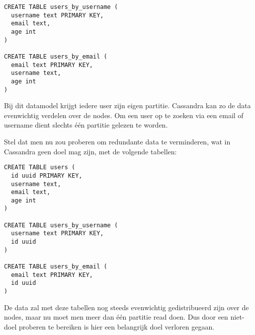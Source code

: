 \begin{lstlisting}
CREATE TABLE users_by_username (
  username text PRIMARY KEY,
  email text,
  age int
)

CREATE TABLE users_by_email (
  email text PRIMARY KEY,
  username text,
  age int
)
\end{lstlisting}

Bij dit datamodel krijgt iedere user zijn eigen partitie.
Cassandra kan zo de data evenwichtig verdelen over de nodes.
Om een user op te zoeken via een email of username dient slechts één partitie gelezen te worden.

Stel dat men nu zou proberen om redundante data te verminderen, wat in Cassandra geen doel mag zijn, met de volgende tabellen:

\begin{lstlisting}
CREATE TABLE users (
  id uuid PRIMARY KEY,
  username text,
  email text,
  age int
)

CREATE TABLE users_by_username (
  username text PRIMARY KEY,
  id uuid
)

CREATE TABLE users_by_email (
  email text PRIMARY KEY,
  id uuid
)
\end{lstlisting}

De data zal met deze tabellen nog steeds evenwichtig gedistribueerd zijn over de nodes, maar nu moet men meer dan één partitie read doen.
Dus door een niet-doel proberen te bereiken is hier een belangrijk doel verloren gegaan.